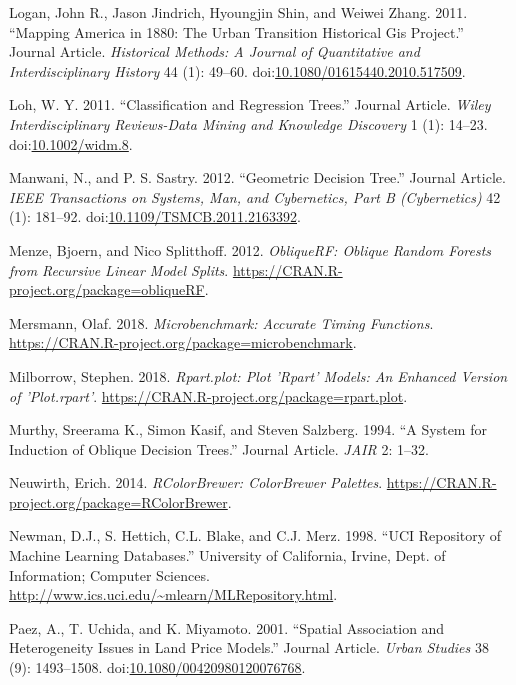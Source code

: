 \documentclass[]{elsarticle} %
\begin{document}
\hypertarget{ref-Logan2011urbanhistorical}{}
Logan, John R., Jason Jindrich, Hyoungjin Shin, and Weiwei Zhang. 2011.
``Mapping America in 1880: The Urban Transition Historical Gis
Project.'' Journal Article. \emph{Historical Methods: A Journal of
Quantitative and Interdisciplinary History} 44 (1): 49--60.
doi:\href{https://doi.org/10.1080/01615440.2010.517509}{10.1080/01615440.2010.517509}.

\hypertarget{ref-Loh2011}{}
Loh, W. Y. 2011. ``Classification and Regression Trees.'' Journal
Article. \emph{Wiley Interdisciplinary Reviews-Data Mining and Knowledge
Discovery} 1 (1): 14--23.
doi:\href{https://doi.org/10.1002/widm.8}{10.1002/widm.8}.

\hypertarget{ref-Manwani2012}{}
Manwani, N., and P. S. Sastry. 2012. ``Geometric Decision Tree.''
Journal Article. \emph{IEEE Transactions on Systems, Man, and
Cybernetics, Part B (Cybernetics)} 42 (1): 181--92.
doi:\href{https://doi.org/10.1109/TSMCB.2011.2163392}{10.1109/TSMCB.2011.2163392}.

\hypertarget{ref-Menze2012}{}
Menze, Bjoern, and Nico Splitthoff. 2012. \emph{ObliqueRF: Oblique
Random Forests from Recursive Linear Model Splits}.
\url{https://CRAN.R-project.org/package=obliqueRF}.

\hypertarget{ref-Mersmann2018}{}
Mersmann, Olaf. 2018. \emph{Microbenchmark: Accurate Timing Functions}.
\url{https://CRAN.R-project.org/package=microbenchmark}.

\hypertarget{ref-Milborrow2018}{}
Milborrow, Stephen. 2018. \emph{Rpart.plot: Plot 'Rpart' Models: An
Enhanced Version of 'Plot.rpart'}.
\url{https://CRAN.R-project.org/package=rpart.plot}.

\hypertarget{ref-Murthy1994}{}
Murthy, Sreerama K., Simon Kasif, and Steven Salzberg. 1994. ``A System
for Induction of Oblique Decision Trees.'' Journal Article. \emph{JAIR}
2: 1--32.

\hypertarget{ref-Neuwirth2014}{}
Neuwirth, Erich. 2014. \emph{RColorBrewer: ColorBrewer Palettes}.
\url{https://CRAN.R-project.org/package=RColorBrewer}.

\hypertarget{ref-Newman1998}{}
Newman, D.J., S. Hettich, C.L. Blake, and C.J. Merz. 1998. ``UCI
Repository of Machine Learning Databases.'' University of California,
Irvine, Dept. of Information; Computer Sciences.
\url{http://www.ics.uci.edu/~mlearn/MLRepository.html}.

\hypertarget{ref-Paez2001}{}
Paez, A., T. Uchida, and K. Miyamoto. 2001. ``Spatial Association and
Heterogeneity Issues in Land Price Models.'' Journal Article.
\emph{Urban Studies} 38 (9): 1493--1508.
doi:\href{https://doi.org/10.1080/00420980120076768}{10.1080/00420980120076768}.
\end{document}
